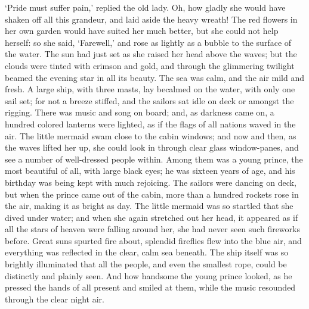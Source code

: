 `Pride must suffer pain,' replied the old lady.
Oh, how gladly she would have shaken off all this grandeur, and laid aside the heavy wreath! The red flowers in her own garden would have suited her much better, but she could not help herself: so she said, `Farewell,' and rose as lightly as a bubble to the surface of the water.
The sun had just set as she raised her head above the waves; but the clouds were tinted with crimson and gold, and through the glimmering twilight beamed the evening star in all its beauty.
The sea was calm, and the air mild and fresh.
A large ship, with three masts, lay becalmed on the water, with only one sail set; for not a breeze stiffed, and the sailors sat idle on deck or amongst the rigging.
There was music and song on board; and, as darkness came on, a hundred colored lanterns were lighted, as if the flags of all nations waved in the air.
The little mermaid swam close to the cabin windows; and now and then, as the waves lifted her up, she could look in through clear glass window-panes, and see a number of well-dressed people within.
Among them was a young prince, the most beautiful of all, with large black eyes; he was sixteen years of age, and his birthday was being kept with much rejoicing.
The sailors were dancing on deck, but when the prince came out of the cabin, more than a hundred rockets rose in the air, making it as bright as day.
The little mermaid was so startled that she dived under water; and when she again stretched out her head, it appeared as if all the stars of heaven were falling around her, she had never seen such fireworks before.
Great suns spurted fire about, splendid fireflies flew into the blue air, and everything was reflected in the clear, calm sea beneath.
The ship itself was so brightly illuminated that all the people, and even the smallest rope, could be distinctly and plainly seen.
And how handsome the young prince looked, as he pressed the hands of all present and smiled at them, while the music resounded through the clear night air.

